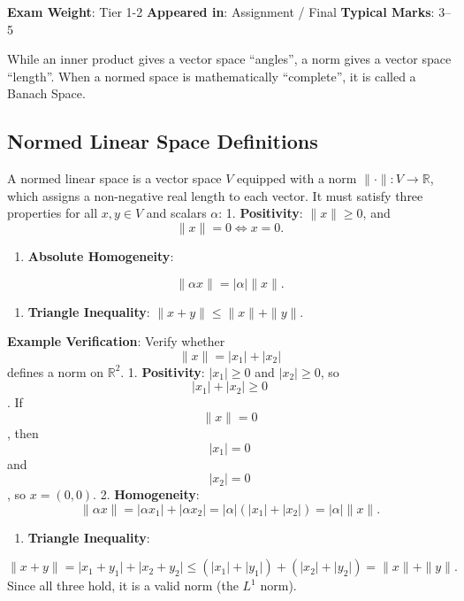 \documentclass[
]{article}
\providecommand{\tightlist}{%
  \setlength{\itemsep}{0pt}\setlength{\parskip}{0pt}}
\renewenvironment{quote}
  {\begin{tcolorbox}[
     colback=calloutbg,
     colframe=calloutframe,
     colupper=callouttext,
     arc=3pt,
     boxrule=0.5pt,
     leftrule=0.5pt,
     borderline west={3pt}{0pt}{calloutaccent},
     left=8pt,
     right=8pt,
     top=6pt,
     bottom=6pt
   ]}
  {\end{tcolorbox}}
\begin{document}
\begin{quote}
\textbf{Exam Weight}: Tier 1-2 \textbar{} \textbf{Appeared in}:
Assignment / Final \textbar{} \textbf{Typical Marks}: 3--5
\end{quote}

While an inner product gives a vector space ``angles'', a norm gives a
vector space ``length''. When a normed space is mathematically
``complete'', it is called a Banach Space.

\subsection{Normed Linear Space
Definitions}\label{normed-linear-space-definitions}

A normed linear space is a vector space \(V\) equipped with a norm
\(\|\cdot\| : V \to \mathbb{R}\), which assigns a non-negative real
length to each vector. It must satisfy three properties for all
\(x, y \in V\) and scalars \(\alpha\): 1. \textbf{Positivity}:
\(\|x\| \geq 0\), and
\[
\|x\| = 0 \iff x = 0.
\]
\begin{enumerate}
\def\labelenumi{\arabic{enumi}.}
\setcounter{enumi}{1}
\tightlist
\item
  \textbf{Absolute Homogeneity}:
\end{enumerate}
\[
\|\alpha x\| = \lvert \alpha \rvert \|x\|.
\]
\begin{enumerate}
\def\labelenumi{\arabic{enumi}.}
\setcounter{enumi}{2}
\tightlist
\item
  \textbf{Triangle Inequality}: \(\|x + y\| \leq \|x\| + \|y\|\).
\end{enumerate}

\textbf{Example Verification}: Verify whether
\[
\|x\| = \lvert x_1 \rvert + \lvert x_2 \rvert
\]
defines a norm on \(\mathbb{R}^2\). 1. \textbf{Positivity}:
\(\lvert x_1 \rvert \geq 0\) and \(\lvert x_2 \rvert \geq 0\), so
\[
\lvert x_1 \rvert + \lvert x_2 \rvert \geq 0
\]
. If
\[
\|x\| = 0
\]
, then
\[
\lvert x_1 \rvert=0
\]
and
\[
\lvert x_2 \rvert=0
\]
, so \(x=(0,0)\). 2. \textbf{Homogeneity}:
\[
\|\alpha x\| = \lvert \alpha x_1 \rvert + \lvert \alpha x_2 \rvert = \lvert \alpha \rvert(\lvert x_1 \rvert + \lvert x_2 \rvert) = \lvert \alpha \rvert\|x\|.
\]
\begin{enumerate}
\def\labelenumi{\arabic{enumi}.}
\setcounter{enumi}{2}
\tightlist
\item
  \textbf{Triangle Inequality}:
\end{enumerate}
\[
\|x + y\| = \lvert x_1 + y_1 \rvert + \lvert x_2 + y_2 \rvert \leq (\lvert x_1 \rvert + \lvert y_1 \rvert) + (\lvert x_2 \rvert + \lvert y_2 \rvert) = \|x\| + \|y\|.
\]
Since all three hold, it is a valid norm (the \(L^1\) norm).
\end{document}
